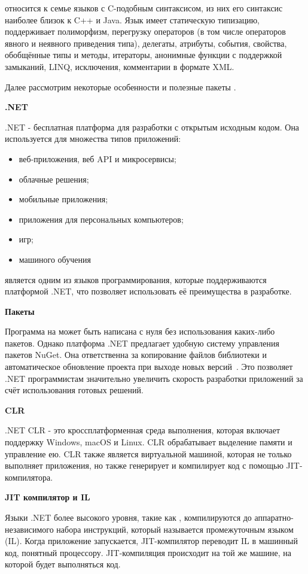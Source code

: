 \csharp относится к семье языков с C-подобным синтаксисом, из них его синтаксис наиболее близок к C++ и Java. Язык имеет статическую типизацию, поддерживает полиморфизм, перегрузку операторов (в том числе операторов явного и неявного приведения типа), делегаты, атрибуты, события, свойства, обобщённые типы и методы, итераторы, анонимные функции с поддержкой замыканий, LINQ, исключения, комментарии в формате XML.

Далее рассмотрим некоторые особенности и полезные пакеты \csharp.

\bigskip
\textbf{.NET}

.NET - бесплатная платформа для разработки с открытым исходным кодом. Она используется для множества типов приложений:
\begin{itemize}
    \item веб-приложения, веб API и микросервисы;
    \item облачные решения;
    \item мобильные приложения;
    \item приложения для персональных компьютеров;
    \item игр;
    \item машиного обучения
\end{itemize}

\csharp является одним из языков программирования, которые поддерживаются платформой .NET, что позволяет использовать её преимущества в разработке.

\bigskip
\textbf{Пакеты}

Программа на \csharp может быть написана с нуля без использования каких-либо пакетов. Однако платформа .NET предлагает удобную систему управления пакетов NuGet. Она ответственна за копирование файлов библиотеки и автоматическое обновление проекта при выходе новых версий~\cite{wiki_nuget}. Это позволяет .NET программистам значительно увеличить скорость разработки приложений за счёт использования готовых решений.

\bigskip
\textbf{CLR}

.NET CLR - это кроссплатформенная среда выполнения, которая включает поддержку Windows, macOS и Linux. CLR обрабатывает выделение памяти и управление ею. CLR также является виртуальной машиной, которая не только выполняет приложения, но также генерирует и компилирует код с помощью JIT-компилятора.

\bigskip
\textbf{JIT компилятор и IL}

Языки .NET более высокого уровня, такие как \csharp, компилируются до аппаратно-независимого набора инструкций, который называется промежуточным языком (IL). Когда приложение запускается, JIT-компилятор переводит IL в машинный код, понятный процессору. JIT-компиляция происходит на той же машине, на которой будет выполняться код.

